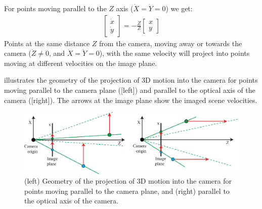 
For points moving parallel to the $Z$ axis ($\dot{X} = \dot{Y} = 0$) we get:
\begin{align}
\begin{bmatrix}
\dot{x} \\
\dot{y}
\end{bmatrix}
= -\frac{\dot{Z}}{Z}
\begin{bmatrix}
x \\
y
\end{bmatrix}
\label{eq:forward_objects}
\end{align}
Points at the same distance $Z$ from the camera, moving away or towards the camera ($\dot{Z} \neq 0$, and $\dot{X} = \dot{Y} = 0$), with the same velocity will project into points moving at different velocities on the image plane.  


\Fig{\ref{fig:examples_3d_moving_points}} illustrates the geometry of the projection of 3D motion into the camera for points moving parallel to the camera plane (\fig{\ref{fig:examples_3d_moving_points}}[left]) and parallel to the optical axis of the camera (\fig{\ref{fig:examples_3d_moving_points}}[right]). The arrows at the image plane show the imaged scene velocities.
\begin{figure}
\centerline{
\includegraphics[width=1\linewidth]{figures/optical_flow/examples_3d_moving_points.eps}
} 
\caption{(left) Geometry of the projection of 3D motion into the camera for points moving parallel to the camera plane, and (right) parallel to the optical axis of the camera.}
\label{fig:examples_3d_moving_points}
\end{figure}

